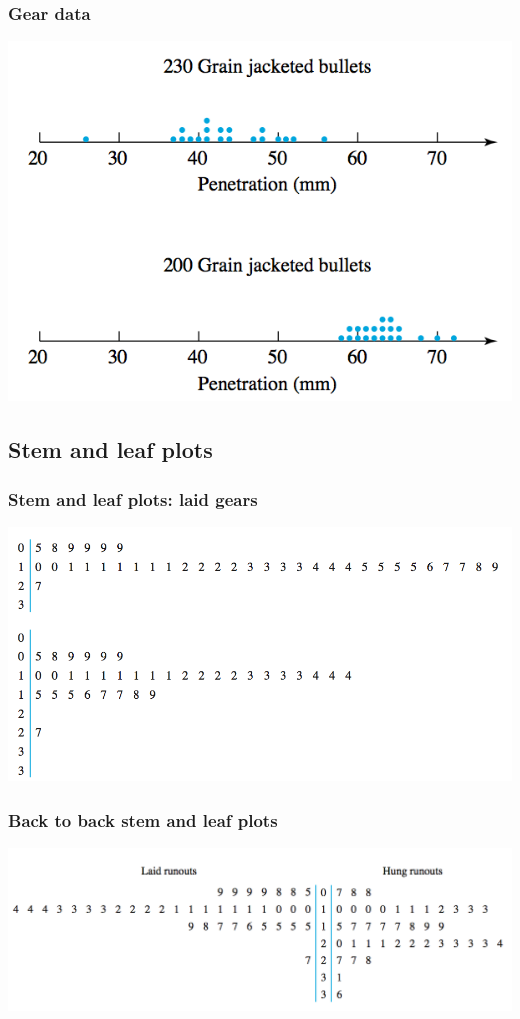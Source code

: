 \documentclass[handout]{beamer}\usepackage{graphicx, color}
\numberwithin{equation}{section}
\begin{document}
\begin{frame}
\frametitle{Gear data}
\begin{center}
 \includegraphics{../../fig/bulletdot.png}
\end{center}
\end{frame}



\subsection{Stem and leaf plots}

\begin{frame}
\frametitle{Stem and leaf plots: laid gears}
\begin{center}
 \includegraphics{../../fig/gearstemlaid.png}
\end{center}
\end{frame}


\begin{frame}
\frametitle{Back to back stem and leaf plots}
\begin{center}
 \includegraphics{../../fig/gearstemback2back.png}
\end{center}
\end{frame}
\end{document}
